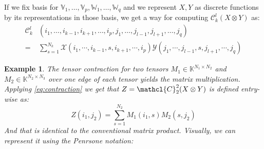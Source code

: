 \documentclass[11pt,a4paper,openright,oneside]{book}
\numberwithin{equation}{section}
\newtheorem{example0}[defn0]{Example}
\newenvironment{example}{ \begin{example0}\rm}{\end{example0}}
\newcommand{\refeq}[1]{\cref{#1}}
\begin{document}
If we fix basis for $\mathbb{V}_1, \dots, \mathbb{V}_p, \mathbb{W}_1, \dots, \mathbb{W}_q$ and we represent $X, Y$
as discrete functions by its representations in those basis, we get a way for computing $\mathcal{C}_k^l(X \otimes Y)$ as:
    \begin{equation}
    \begin{align}\mathcal{C}_k^l & (i_1, \dots, i_{k-1}, i_{k+1}, \dots, i_p, j_1, \dots, j_{l-1}, j_{l+1}, \dots, j_q) \\  =& \sum_{s=1}^{N_k}
        \mathcal{X}(i_1, \cdots, i_{k-1}, s, i_{k+1}, \cdots, i_p) \mathcal{Y}(j_1, \cdots, j_{l-1}, s, j_{l+1}, \cdots, j_q)
\end{align}
\label{eq:contraction}
    \end{equation}

\begin{example}
    The tensor contraction for two tensors $M_1 \in \mathbb{K}^{N_1 \times N_2}$ and $M_2 \in \mathbb{K}^{N_2 \times N_3}$ over one edge of each tensor yields the matrix multiplication.
    Applying \refeq{eq:contraction} we get that $Z = \mathcl{C}_2^2 (X \otimes Y)$ is defined entry-wise as:
    $$Z (i_1, j_2) = \sum_{s=1}^{N_2} M_1(i_1, s) M_2(s, j_2)$$
    And that is identical to the conventional matrix product. Visually, we can represent it using the Penrsone notation:
    \begin{center}
    \hfill
\begin{minipage}{0.2\textwidth}
\end{minipage}
\hfill
\begin{minipage}{0.225\textwidth}
\end{minipage}
\hfill
\begin{minipage}{0.225\textwidth}
\end{minipage}

    \end{center}
\end{example}
\end{document}
